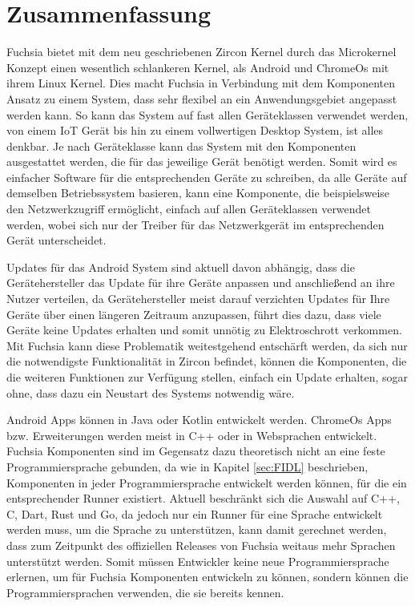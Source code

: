 \documentclass[a4paper]{scrartcl}
\begin{document}
\section{Zusammenfassung}
Fuchsia bietet mit dem neu geschriebenen Zircon Kernel durch das Microkernel Konzept einen wesentlich schlankeren Kernel, als Android und ChromeOs mit ihrem Linux Kernel. Dies macht Fuchsia in Verbindung mit dem Komponenten Ansatz zu einem System, dass sehr flexibel an ein Anwendungsgebiet angepasst werden kann. So kann das System auf fast allen Geräteklassen verwendet werden, von einem IoT Gerät bis hin zu einem vollwertigen Desktop System, ist alles denkbar. Je nach Geräteklasse kann das System mit den Komponenten ausgestattet werden, die für das jeweilige Gerät benötigt werden. Somit wird es einfacher Software für die entsprechenden Geräte zu schreiben, da alle Geräte auf demselben Betriebssystem basieren, kann eine Komponente, die beispielsweise den Netzwerkzugriff ermöglicht, einfach auf allen Geräteklassen verwendet werden, wobei sich nur der Treiber für das Netzwerkgerät im entsprechenden Gerät unterscheidet.

Updates für das Android System sind aktuell davon abhängig, dass die Gerätehersteller das Update für ihre Geräte anpassen und anschließend an ihre Nutzer verteilen, da Gerätehersteller meist darauf verzichten Updates für Ihre Geräte über einen längeren Zeitraum anzupassen, führt dies dazu, dass viele Geräte keine Updates erhalten und somit unnötig zu Elektroschrott verkommen. Mit Fuchsia kann diese Problematik weitestgehend entschärft werden, da sich nur die notwendigste Funktionalität in Zircon befindet, können die Komponenten, die die weiteren Funktionen zur Verfügung stellen, einfach ein Update erhalten, sogar ohne, dass dazu ein Neustart des Systems notwendig wäre.

Android Apps können in Java oder Kotlin entwickelt werden. ChromeOs Apps bzw. Erweiterungen werden meist in C++ oder in Websprachen entwickelt. Fuchsia Komponenten sind im Gegensatz dazu theoretisch nicht an eine feste Programmiersprache gebunden, da wie in Kapitel \ref{sec:FIDL} beschrieben, Komponenten in jeder Programmiersprache entwickelt werden können, für die ein entsprechender Runner existiert. Aktuell beschränkt sich die Auswahl auf C++, C, Dart, Rust und Go, da jedoch nur ein Runner für eine Sprache entwickelt werden muss, um die Sprache zu unterstützen, kann damit gerechnet werden, dass zum Zeitpunkt des offiziellen Releases von Fuchsia weitaus mehr Sprachen unterstützt werden. Somit müssen Entwickler keine neue Programmiersprache erlernen, um für Fuchsia Komponenten entwickeln zu können, sondern können die Programmiersprachen verwenden, die sie bereits kennen.
\end{document}
